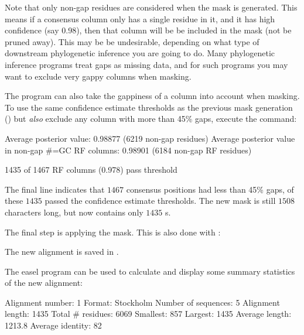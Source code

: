 Note that only non-gap residues are considered when the mask is
generated. This means if a consensus column only has a single residue
in it, and it has high confidence (say 0.98), then that column will be
be included in the mask (not be pruned away). This may be be
undesirable, depending on what type of downstream phylogenetic inference
you are going to do. Many phylogenetic inference programs treat gaps
as missing data, and for such programs you may want to exclude very gappy
columns when masking. 

The  program can also take the gappiness of a
column into account when masking. To use the same confidence estimate
thresholds as the previous  mask generation
() but \emph{also} exclude any column 
with more than 45\% gaps, execute the command:


\begin{sreoutput}
Average posterior value:                            0.98877 (6219 non-gap residues)
Average posterior value in non-gap #=GC RF columns: 0.98901 (6184 non-gap RF residues)

1435 of 1467 RF columns (0.978) pass threshold
\end{sreoutput}

The final line indicates that $1467$ consensus positions had less
than 45\% gaps, of these $1435$ passed the confidence estimate
thresholds. The new mask  is still $1508$ characters
long, but now contains only $1435$ s.

The final step is applying the mask. This is also done with
:


The new alignment is saved in .

The easel program  can be used to calculate and
display some summary statistics of the new alignment:


\begin{sreoutput}
Alignment number:    1
Format:              Stockholm
Number of sequences: 5
Alignment length:    1435
Total # residues:    6069
Smallest:            857
Largest:             1435
Average length:      1213.8
Average identity:    82%
\end{sreoutput}

